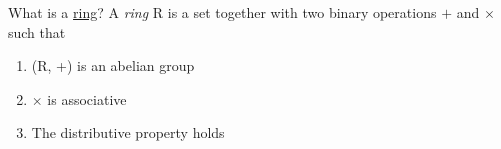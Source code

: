\documentclass[avery5371,grid]{flashcards}
\begin{document}
% 
% 
% 
% 
% 
% 
% 
% 
% 
% 
% 
% 
% 
% 



















\begin{flashcard}[Rings]{What is a \underline{ring}?}
 A \emph{ring} R is a set together with two binary operations $+$ and $\times$ such that
 \begin{enumerate}
      \item (R, +) is an abelian group
      \item $\times$ is associative
      \item The distributive property holds
 \end{enumerate}
\end{flashcard}
\end{document}
